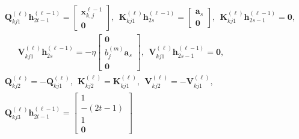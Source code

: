 \documentclass[10pt]{article}
\renewcommand{\hat}{\widehat}
\newcommand{\<}{\left\langle}
\renewcommand{\>}{\right\rangle}
\renewcommand{\bQ}{\mathbf{Q}}
\newcommand{\bzero}{{\mathbf 0}}
\def\bK{{\mathbf K}}
\def\bQ{{\mathbf Q}}
\def\bV{{\mathbf V}}
\def\ba{{\mathbf a}}
\def\bh{{\mathbf h}}
\def\bv{{\mathbf v}}
\def\bx{{\mathbf x}}
\begin{document}
\begin{align*}
    &\bQ_{kj1}^{(\ell)}\bh^{(\ell-1)}_{2t-1}=\begin{bmatrix}
        \bx_{k,j}^{\ell-1}\\\bzero
    \end{bmatrix},~~ \bK_{kj1}^{(\ell)}\bh^{(\ell-1)}_{2s}=\begin{bmatrix}
        \ba_{s}\\\bzero
\end{bmatrix},~~\bK_{kj1}^{(\ell)}\bh^{(\ell-1)}_{2s-1}=\bzero,\\
&~~~~ ~~~\bV_{kj1}^{(\ell)}\bh^{(\ell-1)}_{2s}=-\eta\begin{bmatrix}
        \bzero\\ b_j^{(m)}\ba_s \\ \bzero
    \end{bmatrix},~~\bV_{kj1}^{(\ell)}\bh^{(\ell-1)}_{2s-1}=\bzero,\\
    &
    \bQ_{kj2}^{(\ell)}=-\bQ_{kj1}^{(\ell)},~~ \bK_{kj2}^{(\ell)}=\bK_{kj1}^{(\ell)},~~  \bV_{kj2}^{(\ell)}=-\bV_{kj1}^{(\ell)},\\
     &
     \bQ_{kj3}^{(\ell)}\bh^{(\ell-1)}_{2t-1}=\begin{bmatrix}
         1\\-(2t-1)\\ 1\\\bzero

\end{bmatrix}
\end{align*}
\end{document}
